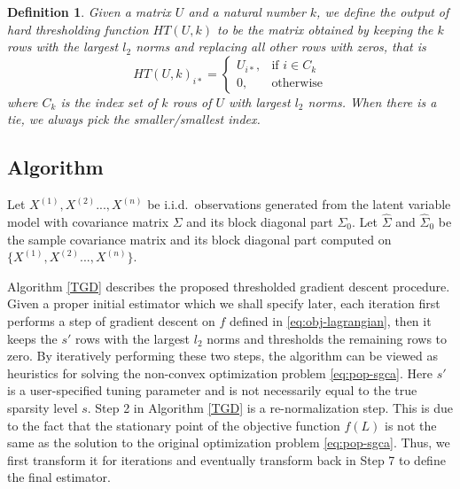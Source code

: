 \documentclass[11pt]{article}
\newcommand{\nb}[1]{\textcolor{orange}{\texttt{[#1]}}}
\newcommand{\0}{{\mathbf{0}}}
\newtheorem{definition}[theorem]{Definition}
\begin{document}
\begin{definition}
Given a matrix $U$ and a natural number $k$, 
we define the output of hard thresholding function $HT(U,k)$ %
to be the matrix obtained by keeping the $k$ rows with the largest $l_2$ norms and replacing all other rows with zeros, 
that is
\begin{equation*}
    HT(U,k)_{i *}= 
\begin{cases}
    U_{i*},& \text{if } i\in C_k\\
    0,              & \text{otherwise}
\end{cases}
\end{equation*}
where $C_k$ 
is the index set of $k$ rows of $U$ with largest $l_2$ norms.
When there is a tie, we always pick the smaller/smallest index.
\end{definition}


\subsection{Algorithm}
\label{sec:tgd_alg}
Let $X^{(1)},X^{(2)}...,X^{(n)}$ be i.i.d.~observations generated from the latent variable model with covariance matrix $\Sigma$ and its block diagonal part $\Sigma_0$. 
Let $\widehat\Sigma$ and $\widehat\Sigma_0$ be the sample covariance matrix and its block diagonal part computed on $\{ X^{(1)},X^{(2)}...,X^{(n)} \}$.

Algorithm \ref{TGD} describes the proposed thresholded gradient descent procedure.
Given a proper initial estimator which we shall specify later, each iteration first performs a step of gradient descent on $f$ defined in \eqref{eq:obj-lagrangian}, then it keeps the $s'$ rows with the largest $l_2$ norms and thresholds the remaining rows to zero.
By iteratively performing these two steps, the algorithm can be viewed as heuristics for solving the non-convex optimization problem \eqref{eq:pop-sgca}. 
Here $s'$ is a user-specified tuning parameter and is not necessarily equal to the true sparsity level $s$.
 Step 2 in Algorithm \ref{TGD} is a re-normalization step. 
This is due to the fact that the stationary point of the objective function $f(L)$ is not the same as the solution to the original optimization problem \eqref{eq:pop-sgca}. 
Thus, we first transform it for iterations and eventually transform back in Step 7 to define the final estimator. 
\end{document}
